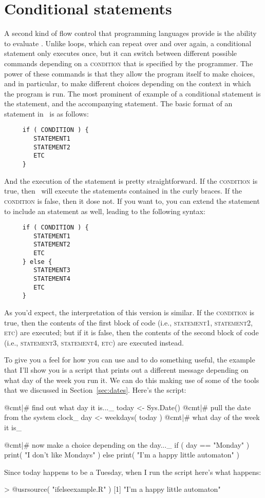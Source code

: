 \section{Conditional statements\label{sec:if}}

A second kind of flow control that programming languages provide is the ability to evaluate . Unlike loops, which can repeat over and over again, a conditional statement only executes once, but it can switch between different possible commands depending on a \textsc{condition} that is specified by the programmer. The power of these commands is that they allow the program itself to make choices, and in particular, to make different choices depending on the context in which the program is run. The most prominent of example of a conditional statement is the  statement, and the accompanying  statement. The basic format of an  statement in \R\ is as follows:
\begin{verbatim}
     if ( CONDITION ) {
        STATEMENT1
        STATEMENT2
        ETC
     }
\end{verbatim}
And the execution of the statement is pretty straightforward. If the \textsc{condition} is true, then \R\ will execute the statements contained in the curly braces. If the \textsc{condition} is false, then it dose not. If you want to, you can extend the  statement to include an  statement as well, leading to the following syntax:
\begin{verbatim}
     if ( CONDITION ) {
        STATEMENT1
        STATEMENT2
        ETC
     } else {
        STATEMENT3
        STATEMENT4
        ETC
     }     
\end{verbatim}
As you'd expect, the interpretation of this version is similar. If the \textsc{condition} is true, then the contents of the first block of code (i.e., \textsc{statement1}, \textsc{statement2}, \textsc{etc}) are executed; but if it is false, then the contents of the second block of code (i.e., \textsc{statement3}, \textsc{statement4}, \textsc{etc}) are executed instead. 

To give you a feel for how you can use  and  to do something useful, the example that I'll show you is a script that prints out a different message depending on what day of the week you run it. We can do this making use of some of the tools that we discussed in Section~\ref{sec:dates}. Here's the script:

\begin{script}
@cmt|# find out what day it is..._
today <- Sys.Date()       @cmt|# pull the date from the system clock_
day <- weekdays( today )  @cmt|# what day of the week it is_

@cmt|# now make a choice depending on the day..._
if ( day == "Monday" ) {
  print( "I don't like Mondays" )
} else {
  print( "I'm a happy little automaton" )
}
\end{script}
Since today happens to be a Tuesday, when I run the script here's what happens:
\begin{rblock1}
> @usr{source( "ifelseexample.R" )}
[1] "I'm a happy little automaton"
\end{rblock1}

